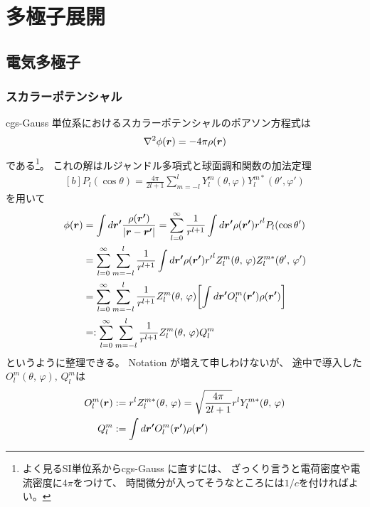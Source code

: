 \documentclass[../master.tex]{subfiles}
\begin{document}
\chapter{多極子展開}
\section{電気多極子}
\subsection{スカラーポテンシャル}
cgs-Gauss 単位系におけるスカラーポテンシャルのポアソン方程式は
\begin{equation}
    \laplacian \phi(\vb*{r}) = -4\pi\rho(\vb*{r})
\end{equation}
である\footnote{よく見るSI単位系からcgs-Gauss に直すには、
ざっくり言うと電荷密度や電流密度に\(4\pi\)をつけて、
時間微分が入ってそうなところには\(1/c\)を付ければよい。}。
これの解はルジャンドル多項式と球面調和関数の加法定理
\begin{equation}\begin{aligned}[b]
    P_l(\cos\theta) = \frac{4\pi}{2l+1}\sum_{m=-l}^{l}Y_l^m(\theta,\varphi)Y_l^{m*}(\theta',\varphi')
\end{aligned}\end{equation}
を用いて
\begin{equation}\begin{aligned}[b]
    \phi(\vb*{r})
    &= \int d\vb*{r'} \frac{\rho(\vb*{r'})}{\abs{\vb*{r}-\vb*{r'}}}
    = \sum_{l=0}^{\infty} \frac{1}{r^{l+1}} \int d\vb*{r'} \rho(\vb*{r'}) {r'}^{l} P_l(\cos\theta')\\
    &= \sum_{l=0}^{\infty} \sum_{m=-l}^{l} \frac{1}{r^{l+1}}\int d\vb*{r'} \rho(\vb*{r'}){r'}^l Z_l^m(\theta,\,\varphi) Z_l^{m*} (\theta',\,\varphi')\\
    &= \sum_{l=0}^{\infty} \sum_{m=-l}^{l} \frac{1}{r^{l+1}}Z_l^m(\theta,\,\varphi) \qty[\int d\vb*{r'} O_l^{m}(\vb*{r'})\rho(\vb*{r'})]\\
    &=:\sum_{l=0}^{\infty} \sum_{m=-l}^{l} \frac{1}{r^{l+1}}Z_l^m(\theta,\,\varphi) Q_l^m
\end{aligned}\end{equation}
というように整理できる。
Notation が増えて申しわけないが、
途中で導入した\(O_l^m(\theta,\,\varphi),\,Q_l^m\)は
\begin{align}
    O_l^m(\vb*{r}) &:= r^l Z_l^{m*}(\theta,\,\varphi) = \sqrt{\frac{4\pi}{2l+1}}r^lY_l^{m*}(\theta,\,\varphi)\\
    Q_l^m &:= \int d\vb*{r'} O_l^{m}(\vb*{r'}) \rho(\vb*{r'})
\end{align}
\end{document}
